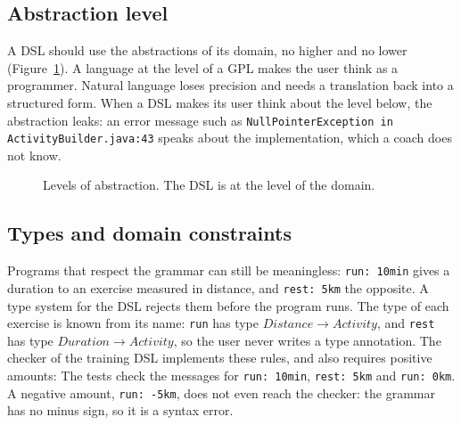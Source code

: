 \subsection{Abstraction level}

A DSL should use the abstractions of its domain, no higher and no lower
(Figure~\ref{fig:abstraction}). A language at the level of a GPL makes the
user think as a programmer. Natural language loses precision and needs a
translation back into a structured form. When a DSL makes its user think about
the level below, the abstraction leaks: an error message such as
\texttt{NullPointerException in ActivityBuilder.java:43} speaks about the
implementation, which a coach does not know.

\begin{figure}[h]
\centering
{}
\caption{Levels of abstraction. The DSL is at the level of the domain.}
\label{fig:abstraction}
\end{figure}

\subsection{Types and domain constraints}

Programs that respect the grammar can still be meaningless:
\texttt{run: 10min} gives a duration to an exercise measured in distance, and
\texttt{rest: 5km} the opposite. A type system for the DSL rejects them before
the program runs. The type of each exercise is known from its name:
\texttt{run} has type $\mathit{Distance} \to \mathit{Activity}$, and
\texttt{rest} has type $\mathit{Duration} \to \mathit{Activity}$, so the user
never writes a type annotation. The checker of the training DSL implements
these rules, and also requires positive amounts:
The tests check the messages for \texttt{run: 10min}, \texttt{rest: 5km} and
\texttt{run: 0km}. A negative amount, \texttt{run: -5km}, does not even reach
the checker: the grammar has no minus sign, so it is a syntax error.


